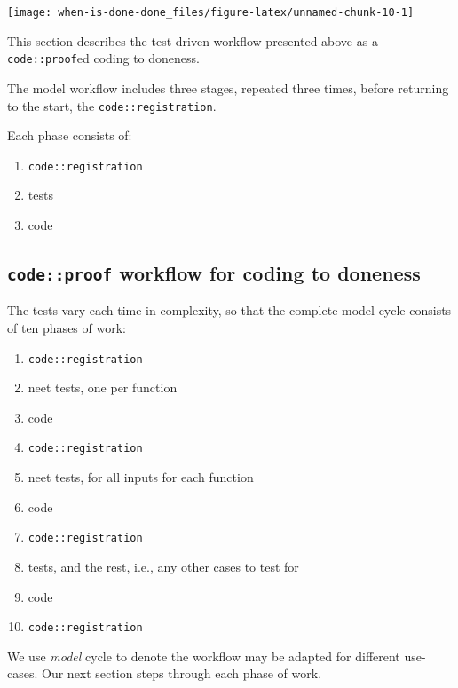 \documentclass[
]{article}
\providecommand{\tightlist}{%
  \setlength{\itemsep}{0pt}\setlength{\parskip}{0pt}}
\begin{document}
\begin{center}\texttt{[image: when-is-done-done\_files/figure-latex/unnamed-chunk-10-1]} \end{center}

This section describes the test-driven workflow presented above as a
\texttt{code::proof}ed coding to doneness.

The model workflow includes three stages, repeated three times, before
returning to the start, the \texttt{code::registration}.

Each phase consists of:

\begin{enumerate}
\def\labelenumi{\arabic{enumi}.}
\tightlist
\item
  \texttt{code::registration}
\item
  tests
\item
  code
\end{enumerate}

\hypertarget{codeproof-workflow-for-coding-to-doneness}{%
\subsection{\texorpdfstring{\texttt{code::proof} workflow for coding to
doneness}{code::proof workflow for coding to doneness}}\label{codeproof-workflow-for-coding-to-doneness}}

The tests vary each time in complexity, so that the complete model cycle
consists of ten phases of work:

\begin{enumerate}
\def\labelenumi{\arabic{enumi}.}
\tightlist
\item
  \texttt{code::registration}
\item
  neet tests, one per function
\item
  code
\item
  \texttt{code::registration}
\item
  neet tests, for all inputs for each function
\item
  code
\item
  \texttt{code::registration}
\item
  tests, and the rest, i.e., any other cases to test for
\item
  code
\item
  \texttt{code::registration}
\end{enumerate}

We use \emph{model} cycle to denote the workflow may be adapted for
different use-cases. Our next section steps through each phase of work.
\end{document}
